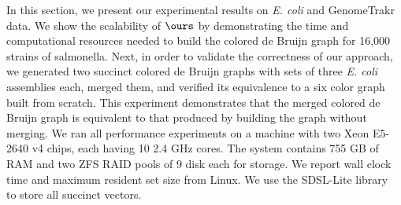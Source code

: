 
In this section, we present our experimental results on {\em E. coli} and GenomeTrakr data. We show the scalability of $\ours$ by demonstrating the time and computational resources needed to build the colored de Bruijn graph for 16,000 strains of salmonella.  Next, in order to validate the correctness of our approach, we generated two succinct colored de Bruijn graphs with sets of three  \emph{E. coli} assemblies each, merged them, and verified its equivalence to a six color graph built from scratch.  This experiment demonstrates that the merged colored de Bruijn graph is equivalent to that produced by building the graph without merging.    We ran all performance experiments on a machine with two Xeon E5-2640 v4 chips, each having 10 2.4 GHz cores.  The system contains 755 GB of RAM and two ZFS RAID pools of 9 disk each for storage.  We report wall clock time and maximum resident set size from Linux.  We use the SDSL-Lite library~\cite{SDSL} to store all succinct vectors. %
 


